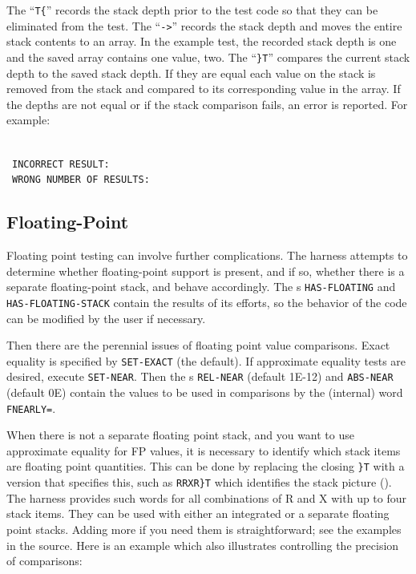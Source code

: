 The ``\texttt{T\{}'' records the stack depth prior to the test code
so that they can be eliminated from the test.
The ``\texttt{->}'' records the stack depth and moves the entire stack
contents to an array.  In the example test, the recorded stack depth
is one and the saved array contains one value, two.
The ``\texttt{\}T}'' compares the current stack depth to the saved
stack depth.  If they are equal each value on the stack is removed
from the stack and compared to its corresponding value in the array.
If the depths are not equal or if the stack comparison fails, an error
is reported.  For example:

 \\
\ \texttt{INCORRECT RESULT:}  \\
\   \texttt{WRONG NUMBER OF RESULTS:}  \\

\subsection{Floating-Point}

Floating point testing can involve further complications.  The harness
attempts to determine whether floating-point support is present, and
if so, whether there is a separate floating-point stack, and behave
accordingly.  The s \texttt{HAS-FLOATING} and
\texttt{HAS-FLOATING-STACK} contain the results of its efforts, so
the behavior of the code can be modified by the user if necessary.

Then there are the perennial issues of floating point value
comparisons.  Exact equality is specified by \texttt{SET-EXACT}
(the default).  If approximate equality tests are desired, execute
\texttt{SET-NEAR}.  Then the \linebreak
{}s \texttt{REL-NEAR} (default 1E-12) and
\texttt{ABS-NEAR} (default 0E) contain the values to be used in
comparisons by the (internal) word \texttt{FNEARLY=}.

When there is not a separate floating point stack, and you want to use
approximate equality for FP values, it is necessary to identify which
stack items are floating point quantities.  This can be done by
replacing the closing \texttt{\}T} with a version that specifies
this, such as \texttt{RRXR\}T} which identifies the stack picture
\linebreak ().  The harness provides such words for all
combinations of R and X with up to four stack items.  They can be
used with either an integrated or a separate floating point stacks.
Adding more if you need them is straightforward; see the examples in
the source.  Here is an example which also illustrates controlling
the precision of comparisons:


